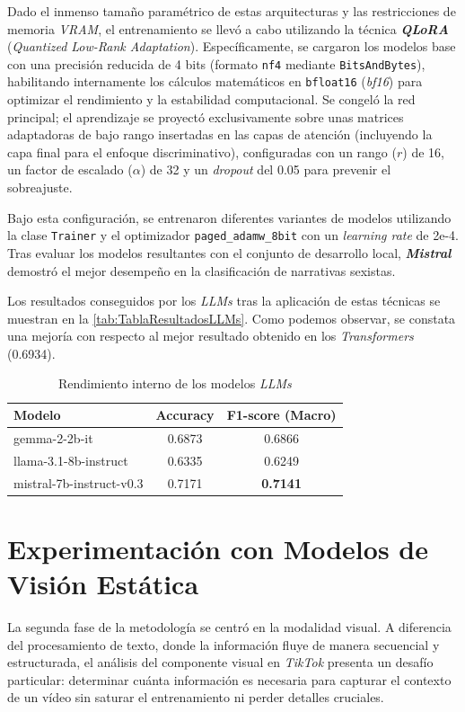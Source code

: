 Dado el inmenso tamaño paramétrico de estas arquitecturas y las restricciones de memoria \textit{VRAM}, el entrenamiento se llevó a cabo utilizando la técnica \textbf{\textit{QLoRA}} (\textit{Quantized Low-Rank Adaptation}). Específicamente, se cargaron los modelos base con una precisión reducida de 4 bits (formato \texttt{nf4} mediante \texttt{BitsAndBytes}), habilitando internamente los cálculos matemáticos en \texttt{bfloat16} (\textit{bf16}) para optimizar el rendimiento y la estabilidad computacional. Se congeló la red principal; el aprendizaje se proyectó exclusivamente sobre unas matrices adaptadoras de bajo rango insertadas en las capas de atención (incluyendo la capa final para el enfoque discriminativo), configuradas con un rango ($r$) de 16, un factor de escalado ($\alpha$) de 32 y un \textit{dropout} del 0.05 para prevenir el sobreajuste. 

Bajo esta configuración, se entrenaron diferentes variantes de modelos utilizando la clase \texttt{Trainer} y el optimizador \texttt{paged\_adamw\_8bit} con un \textit{learning rate} de 2e-4. Tras evaluar los modelos resultantes con el conjunto de desarrollo local, \textbf{\textit{Mistral}} demostró el mejor desempeño en la clasificación de narrativas sexistas.

Los resultados conseguidos por los \textit{LLMs} tras la aplicación de estas técnicas se muestran en la \autoref{tab:TablaResultadosLLMs}. Como podemos observar, se constata una mejoría con respecto al mejor resultado obtenido en los \textit{Transformers} (0.6934).

\begin{table}[H]
    \centering
    \begin{tabular}{lcc}
        \toprule
        \textbf{Modelo} & \textbf{Accuracy} & \textbf{F1-score (Macro)} \\
        \midrule 
            gemma-2-2b-it  & 0.6873 & 0.6866 \\
            llama-3.1-8b-instruct   & 0.6335 & 0.6249 \\
            mistral-7b-instruct-v0.3   & 0.7171 & \textbf{0.7141} \\
        \bottomrule
    \end{tabular}
    \caption{Rendimiento interno de los modelos \textit{LLMs}}
    \label{tab:TablaResultadosLLMs}
\end{table}

\section{Experimentación con Modelos de Visión Estática}
\label{sec:ExperimentacionConModelosDeVisionEstatica}
La segunda fase de la metodología se centró en la modalidad visual. A diferencia del procesamiento de texto, donde la información fluye de manera secuencial y estructurada, el análisis del componente visual en \textit{TikTok} presenta un desafío particular: determinar cuánta información es necesaria para capturar el contexto de un vídeo sin saturar el entrenamiento ni perder detalles cruciales.

